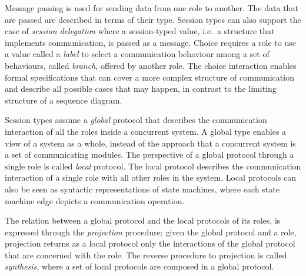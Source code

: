 Message passing is used for sending data from one role to another.
The data that are passed are described in terms of their type. Session
types can also support the case of {\em session delegation}
where a session-typed value, i.e.~a structure that implements communication,
is passed as a message.
Choice requires a role to use a value called a {\em label}
to select a communication behaviour among
a set of behaviours, called {\em branch}, offered by another role.
The choice interaction enables formal specifications that can
cover a more complex structure of communication and describe all possible
cases that may happen, in contrast to the limiting structure of
a sequence diagram.

Session types assume a {\em global} protocol that describes the
communication interaction of all the roles inside a concurrent system.
A global type enables a view of a system as a whole, instead of the
approach that a concurrent system is a set of communicating modules.
The perspective of a global protocol through a single role
is called {\em local} protocol. The local protocol describes
the communication interaction of a single role with all other roles
in the system. Local protocols can also be seen as syntactic
representations of state machines, where each state machine edge
depicts a communication operation.

The relation between a global protocol and the
local protocols of its roles, is expressed
through the {\em projection} procedure;
given the global protocol and a role, projection
returns as a local protocol only the
interactions of the global protocol that are concerned with
the role.
%
The reverse procedure to projection is called {\em synthesis},
where a set of local protocols are composed %
in a global protocol.


